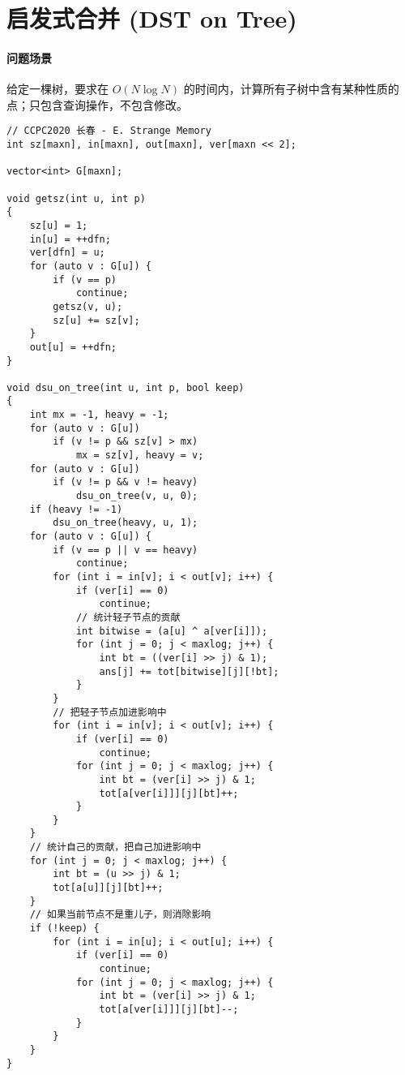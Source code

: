\section{启发式合并 (DST on Tree)}
\paragraph{问题场景} 给定一棵树，要求在 $O(N\log N)$ 的时间内，计算所有子树中含有某种性质的点；只包含查询操作，不包含修改。
\begin{verbatim}
// CCPC2020 长春 - E. Strange Memory
int sz[maxn], in[maxn], out[maxn], ver[maxn << 2];

vector<int> G[maxn];

void getsz(int u, int p)
{
    sz[u] = 1;
    in[u] = ++dfn;
    ver[dfn] = u;
    for (auto v : G[u]) {
        if (v == p)
            continue;
        getsz(v, u);
        sz[u] += sz[v];
    }
    out[u] = ++dfn;
}

void dsu_on_tree(int u, int p, bool keep)
{
    int mx = -1, heavy = -1;
    for (auto v : G[u])
        if (v != p && sz[v] > mx)
            mx = sz[v], heavy = v;
    for (auto v : G[u])
        if (v != p && v != heavy)
            dsu_on_tree(v, u, 0);
    if (heavy != -1)
        dsu_on_tree(heavy, u, 1);
    for (auto v : G[u]) {
        if (v == p || v == heavy)
            continue;
        for (int i = in[v]; i < out[v]; i++) {
            if (ver[i] == 0)
                continue;
            // 统计轻子节点的贡献
            int bitwise = (a[u] ^ a[ver[i]]);
            for (int j = 0; j < maxlog; j++) {
                int bt = ((ver[i] >> j) & 1);
                ans[j] += tot[bitwise][j][!bt];
            }
        }
        // 把轻子节点加进影响中
        for (int i = in[v]; i < out[v]; i++) {
            if (ver[i] == 0)
                continue;
            for (int j = 0; j < maxlog; j++) {
                int bt = (ver[i] >> j) & 1;
                tot[a[ver[i]]][j][bt]++;
            }
        }
    }
    // 统计自己的贡献，把自己加进影响中
    for (int j = 0; j < maxlog; j++) {
        int bt = (u >> j) & 1;
        tot[a[u]][j][bt]++;
    }
    // 如果当前节点不是重儿子，则消除影响
    if (!keep) {
        for (int i = in[u]; i < out[u]; i++) {
            if (ver[i] == 0)
                continue;
            for (int j = 0; j < maxlog; j++) {
                int bt = (ver[i] >> j) & 1;
                tot[a[ver[i]]][j][bt]--;
            }
        }
    }
}
\end{verbatim}